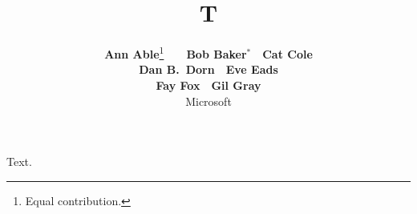 \documentclass{article}
\title{T}
\author{\textbf{Ann Able}\thanks{Equal contribution.}~~\ \ \textbf{Bob Baker}$^{*}$\ \ \textbf{Cat Cole}\\
\textbf{Dan B.~Dorn}\ \ \textbf{Eve Eads}\\
\textbf{Fay Fox}\ \ \textbf{Gil Gray}\\
Microsoft}
\begin{document}
\maketitle
Text.
\end{document}
